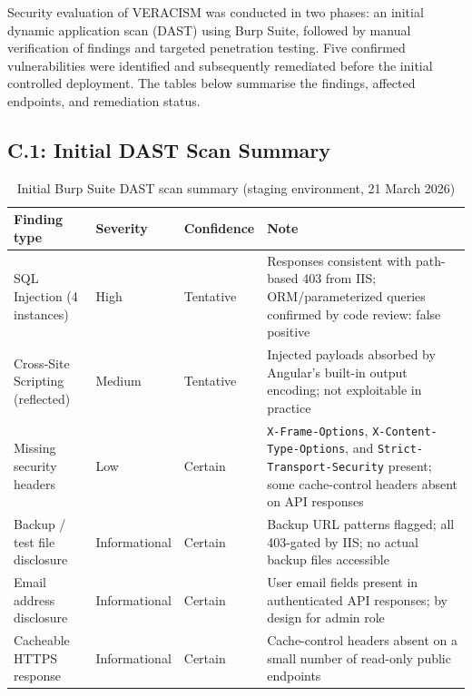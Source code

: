 Security evaluation of VERACISM was conducted in two phases: an initial
dynamic application scan (DAST) using Burp Suite, followed by manual
verification of findings and targeted penetration testing.  Five confirmed
vulnerabilities were identified and subsequently remediated before the initial
controlled deployment.  The tables below summarise the findings, affected
endpoints, and remediation status.

\subsection*{C.1: Initial DAST Scan Summary}

\begin{table}[H]
  \centering
  \smalltable
  \footnotesize
  {%
  \setlength{\tabcolsep}{6pt}
  \renewcommand{\arraystretch}{1.3}
  \begin{tabular}{|>{\raggedright\arraybackslash}p{}|
                  >{\centering\arraybackslash}p{}|
                  >{\centering\arraybackslash}p{}|
                  >{\raggedright\arraybackslash}p{}|}
    \hline
    \textbf{Finding type} & \textbf{Severity} & \textbf{Confidence} & \textbf{Note} \\
    \hline\hline
    SQL Injection (4 instances) & High & Tentative & Responses consistent with path-based 403 from IIS; ORM/parameterized queries confirmed by code review: false positive \\
    \hline
    Cross-Site Scripting (reflected) & Medium & Tentative & Injected payloads absorbed by Angular's built-in output encoding; not exploitable in practice \\
    \hline
    Missing security headers & Low & Certain & \texttt{X-Frame-Options}, \texttt{X-Content-Type-Options}, and \texttt{Strict-Transport-Security} present; some cache-control headers absent on API responses \\
    \hline
    Backup / test file disclosure & Informational & Certain & Backup URL patterns flagged; all 403-gated by IIS; no actual backup files accessible \\
    \hline
    Email address disclosure & Informational & Certain & User email fields present in authenticated API responses; by design for admin role \\
    \hline
    Cacheable HTTPS response & Informational & Certain & Cache-control headers absent on a small number of read-only public endpoints \\
    \hline
  \end{tabular}
  }%
  \captionsetup{type=table}
  \caption{Initial Burp Suite DAST scan summary (staging environment, 21 March 2026)}
  \label{tab:dast-summary}
\end{table}

